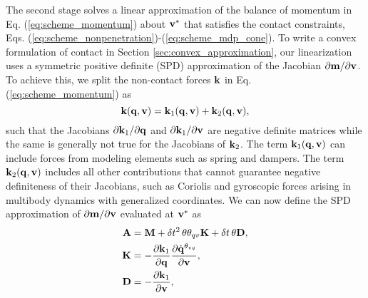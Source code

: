 The second stage solves a linear approximation of the balance of momentum in Eq.
(\ref{eq:scheme_momentum}) about ${\mathbf{v}}^*$ that satisfies the contact
constraints, Eqs. (\ref{eq:scheme_nonpenetration})-(\ref{eq:scheme_mdp_cone}). To write
a convex formulation of contact in Section \ref{sec:convex_approximation}, our
linearization uses a symmetric positive definite (SPD) approximation of
the Jacobian $\partial {\mathbf{m}}/\partial {\mathbf{v}}$. To achieve this, we split the
non-contact forces ${\mathbf{k}}$ in Eq. (\ref{eq:scheme_momentum}) as
\begin{equation*}
	{\mathbf{k}}({\mathbf{q}}, {\mathbf{v}}) = {\mathbf{k}}_1({\mathbf{q}}, {\mathbf{v}})+{\mathbf{k}}_2({\mathbf{q}}, {\mathbf{v}}),
\end{equation*}
such that the Jacobians $\partial {\mathbf{k}}_1/\partial{\mathbf{q}}$ and $\partial
{\mathbf{k}}_1/\partial{\mathbf{v}}$ are negative definite matrices while the same is
generally not true for the Jacobians of ${\mathbf{k}}_2$. The term ${\mathbf{k}}_1({\mathbf{q}},
{\mathbf{v}})$ can include forces from modeling elements such as spring and dampers.
The term ${\mathbf{k}}_2({\mathbf{q}}, {\mathbf{v}})$ includes all other contributions that cannot
guarantee negative definiteness of their Jacobians, such as Coriolis and
gyroscopic forces arising in multibody dynamics with generalized coordinates. We
can now define the SPD approximation of $\partial {\mathbf{m}}/\partial {\mathbf{v}}$
evaluated at ${\mathbf{v}}^*$ as
\begin{align}
	\mf{A}&=\mf{M}+\delta t^2\,\theta\theta_{qv}\mf{K}+\delta t\,\theta\mf{D},
	\label{eq:expression_for_A}\\
	\mf{K}&=-\frac{\partial \mf{k}_1}{\partial
	\mf{q}}\frac{\partial\dot{\mf{q}}^{\theta_{vq}}}{\partial\mf{v}},
	\label{eq:stiffness_matrix}\\
	\mf{D}&=-\frac{\partial \mf{k}_1}{\partial\mf{v}},
	\label{eq:dissipation_matrix}
\end{align}

